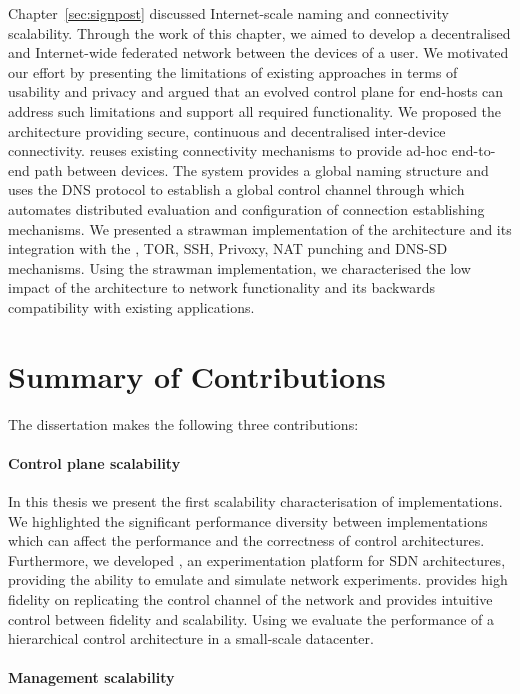 Chapter~\ref{sec:signpost} discussed Internet-scale naming and connectivity
scalability.  Through the work of this chapter, we aimed to develop a
decentralised and Internet-wide federated network between the devices of a user.
We motivated our effort by presenting the limitations of existing approaches in
terms of usability and privacy and argued that an evolved control plane for
end-hosts can address such limitations and support all required functionality.
We proposed the \signpost architecture providing secure, continuous and
decentralised inter-device connectivity. \signpost reuses existing connectivity
mechanisms to provide ad-hoc end-to-end path between devices. The system
provides a global naming structure and uses the DNS protocol to establish a
global control channel through which \signpost automates distributed evaluation
and configuration of connection establishing mechanisms.  We presented a
strawman implementation  of the \signpost architecture and its integration with
the \openvpn, TOR, SSH, Privoxy, NAT punching and DNS-SD mechanisms.  Using the
\signpost strawman implementation, we characterised the low impact of the
architecture to network functionality and its backwards compatibility with
existing applications. 

\section{Summary of Contributions}

The dissertation makes the following three contributions:

\paragraph{Control plane scalability} 
In this thesis we present the first scalability characterisation of \of
implementations. We highlighted the significant performance diversity between
implementations which can affect the performance and the correctness of control
architectures.  Furthermore, we developed \sdnsim, an experimentation platform
for SDN architectures, providing the ability to emulate and simulate network
experiments. \sdnsim provides high fidelity on replicating the control channel
of the network and provides intuitive control between fidelity and scalability. 
Using \sdnsim we evaluate the performance of a hierarchical control architecture
in a small-scale datacenter.

\paragraph{Management scalability}

